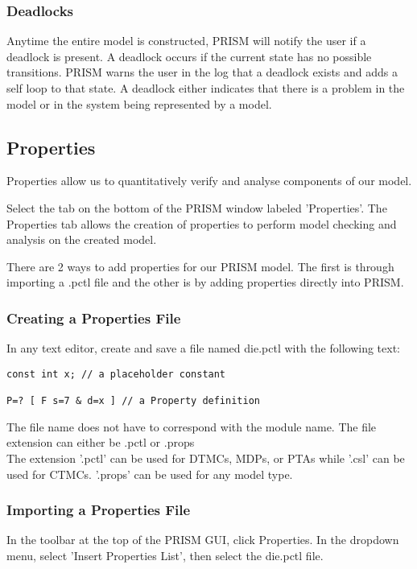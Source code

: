 \documentclass[a4paper]{article}
\begin{document}
\subsubsection{Deadlocks}

Anytime the entire model is constructed, PRISM will notify the user if a deadlock is present. A deadlock occurs if the current state has no possible transitions. PRISM warns the user in the log that a deadlock exists and adds a self loop to that state. A deadlock either indicates that there is a problem in the model or in the system being represented by a model. 

\subsection{Properties}
Properties allow us to quantitatively verify and analyse components of our model. 

Select the tab on the bottom of the PRISM window labeled 'Properties'. 
The Properties tab allows the creation of properties to perform model checking and analysis on the created model. 

There are 2 ways to add properties for our PRISM model. The first is through importing a .pctl file and the other is by adding properties directly into PRISM. 

\subsubsection{Creating a Properties File}
In any text editor, create and save a file named die.pctl with the following text:

\begin{lstlisting}
const int x; // a placeholder constant

P=? [ F s=7 & d=x ] // a Property definition

\end{lstlisting}

The file name does not have to correspond with the module name. The file extension can either be .pctl or .props
\\[1\baselineskip]
The extension '.pctl' can be used for DTMCs, MDPs, or PTAs while '.csl' can be used for CTMCs. '.props' can be used for any model type. 


\subsubsection{Importing a Properties File}
In the toolbar at the top of the PRISM GUI, click Properties. In the dropdown menu, select 'Insert Properties List', then select the die.pctl
file.
\end{document}
